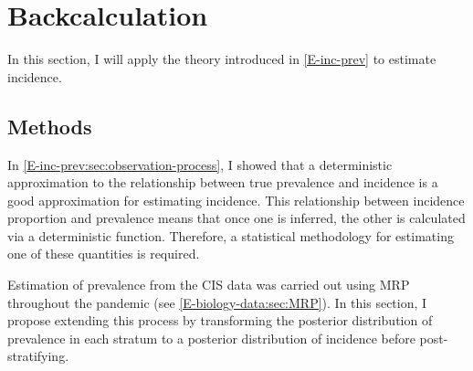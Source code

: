 \documentclass[thesis.tex]{subfiles}
\begin{document}
\section{Backcalculation} \label{backcalc}

In this section, I will apply the theory introduced in \cref{E-inc-prev} to estimate incidence.


\subsection{Methods} \label{backcalc:sec:methods}

In \cref{E-inc-prev:sec:observation-process}, I showed that a deterministic approximation to the relationship between true prevalence and incidence is a good approximation for estimating incidence.
This relationship between incidence proportion and prevalence means that once one is inferred, the other is calculated via a deterministic function.
Therefore, a statistical methodology for estimating one of these quantities is required.

Estimation of prevalence from the CIS data was carried out using MRP throughout the pandemic (see \cref{E-biology-data:sec:MRP}).
In this section, I propose extending this process by transforming the posterior distribution of prevalence in each stratum to a posterior distribution of incidence before post-stratifying.
\end{document}

